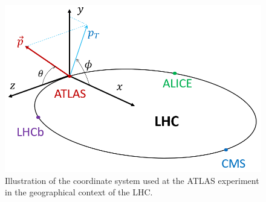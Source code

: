 \begin{figure}[bht]
	\begin{centering}	
	\includegraphics[width=.75\textwidth]{Detector/plots/ATLAS coordinate system.png}
	\caption{Illustration of the coordinate system
	used at the ATLAS experiment in the geographical context of the LHC.
		}
	\label{fig:ATLAS_coordinate_system}
	\end{centering}
\end{figure}

